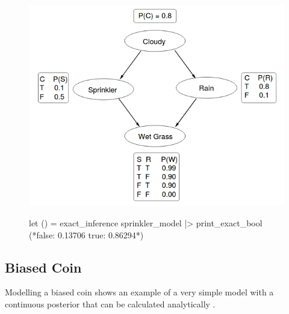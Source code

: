 \begin{figure}[!htb]
	\centering
	\begin{minipage}{0.47\linewidth}
		\label{lst:sprinkler}						
	\end{minipage}
	\begin{minipage}{0.47\linewidth}
		\includegraphics[width=\linewidth]{figs/sprinkler-network.png}
		\label{fig:sprinkler-network}
		\vspace{0.3cm}
		\begin{ocamlcode-in}
let () =
  exact_inference sprinkler_model
  |> print_exact_bool
(*false: 0.13706 true: 0.86294*)
		\end{ocamlcode-in}
		\label{lst:inf-output}
	\end{minipage}
\end{figure}

\subsection{Biased Coin} \label{sec:coin} 
Modelling a biased coin shows an example of a very simple model with a continuous posterior that can be calculated analytically \cite{datasci}. 

